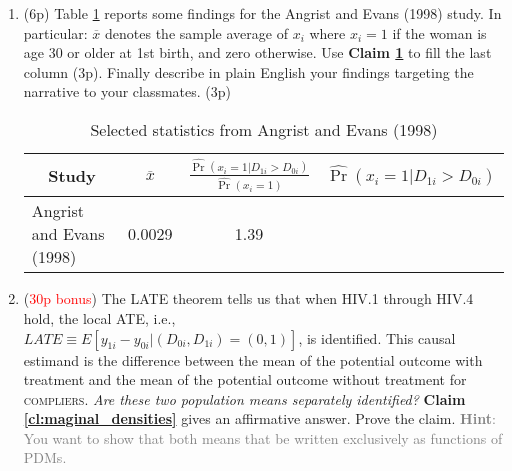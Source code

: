 \documentclass{article}
\newtheorem{claim}[theorem]{Claim}
\begin{document}
\begin{enumerate}[label=\textbf{Q\arabic{enumi}}.,ref=Q\arabic{enumi}, wide=0pt, itemsep=0em, topsep=5pt, labelindent=0pt, resume]
\begin{claim}\label{cl:complier_distr_x}
Let $p_{c}\left( 1\right) $ denote the share of \textsc{compliers} amongst the units with $x_i=1\,$. Under \textbf{HIV.1} through \textbf{HIV.4}, the relative likelihood that a \textsc{complier} has characteristic $x_i=1$ is given by 
\begin{equation}
\frac{\Pr \left( x_{i}=1|D_{1i}>D_{0i}\right) }{\Pr \left( x_{i}=1\right) }=\frac{p_{c}\left( 1\right) }{p_{c}}\text{.}  \label{rel_like}
\end{equation}
\end{claim}


\item (6p) Table \ref{tab:ds-angrist-3} reports some findings for the Angrist and Evans (1998) study. In particular: $\overline{x}$ denotes the sample average of $x_i$ where $x_i=1$ if the woman is age 30 or older at 1st birth, and zero otherwise. Use \textbf{Claim \ref{cl:complier_distr_x}} to fill the last column (3p). Finally describe in plain English your findings targeting the narrative to your classmates. (3p)

\begin{table}[H]
\centering
{\renewcommand{\arraystretch}{1.7}
\begin{tabular}{cccc}
\hline\hline
\textbf{Study} & $\overline{x}$ & $\frac{\widehat{\Pr }\left(
x_{i}=1|D_{1i}>D_{0i}\right) }{\widehat{\Pr }\left( x_{i}=1\right) }$ & $\widehat{\Pr }\left( x_{i}=1|D_{1i}>D_{0i}\right) $ \\ \hline
\multicolumn{1}{l}{Angrist and Evans (1998)} & \multicolumn{1}{l}{0.0029} & 
1.39 &  \\ \hline\hline
\end{tabular}}
\caption{Selected statistics from Angrist and Evans (1998)}
\label{tab:ds-angrist-3}
\end{table}

\item (\textcolor{red}{30p bonus}) The LATE theorem tells us that when HIV.1 through HIV.4 hold, the local ATE, i.e., \\ $LATE \equiv E\left[y_{1i}-y_{0i}|\left( D_{0i},D_{1i}\right) =\left( 0,1\right) \right]$, is identified. This causal estimand is the difference between the mean of the potential outcome with treatment and the mean of the potential outcome without treatment for \textsc{compliers}. \textit{Are these two population means separately identified?} \textbf{Claim \ref{cl:maginal_densities}} gives an affirmative answer. Prove the claim. \textcolor{gray}{\textbf{Hint}: You want to show that both means that be written exclusively as functions of PDMs.}


\end{enumerate}
\end{document}
